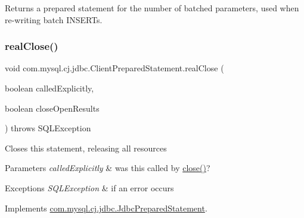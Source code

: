 Returns a prepared statement for the number of batched parameters, used when re-\/writing batch I\+N\+S\+E\+R\+Ts. \mbox{\label{classcom_1_1mysql_1_1cj_1_1jdbc_1_1_client_prepared_statement_a352b21fa4a782cfad4065a227985201a}} 
\subsubsection{\texorpdfstring{real\+Close()}{realClose()}}
{\footnotesize\ttfamily void com.\+mysql.\+cj.\+jdbc.\+Client\+Prepared\+Statement.\+real\+Close (\begin{DoxyParamCaption}\item[{boolean}]{called\+Explicitly,  }\item[{boolean}]{close\+Open\+Results }\end{DoxyParamCaption}) throws S\+Q\+L\+Exception}

Closes this statement, releasing all resources


\begin{DoxyParams}{Parameters}
{\em called\+Explicitly} & was this called by \mbox{\hyperlink{classcom_1_1mysql_1_1cj_1_1jdbc_1_1_statement_impl_ac913294cd1adc42af73229a6ba2e4f0b}{close()}}?\\
\hline
\end{DoxyParams}

\begin{DoxyExceptions}{Exceptions}
{\em S\+Q\+L\+Exception} & if an error occurs \\
\hline
\end{DoxyExceptions}


Implements \mbox{\hyperlink{interfacecom_1_1mysql_1_1cj_1_1jdbc_1_1_jdbc_prepared_statement}{com.\+mysql.\+cj.\+jdbc.\+Jdbc\+Prepared\+Statement}}.

\mbox{\label{classcom_1_1mysql_1_1cj_1_1jdbc_1_1_client_prepared_statement_a7db4bf1c51418004ea1482b72d2c7913}} 
